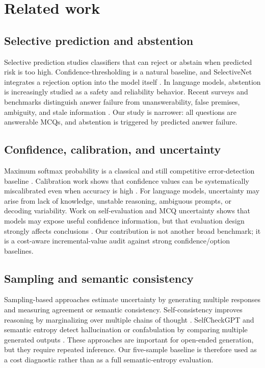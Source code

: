 \documentclass[preprint,12pt,authoryear]{elsarticle}
\begin{document}



\section{Related work}
\subsection{Selective prediction and abstention}
Selective prediction studies classifiers that can reject or abstain when predicted risk is too high. Confidence-thresholding is a natural baseline, and SelectiveNet integrates a rejection option into the model itself \citep{geifman2017selective,geifman2019selectivenet}. In language models, abstention is increasingly studied as a safety and reliability behavior. Recent surveys and benchmarks distinguish answer failure from unanswerability, false premises, ambiguity, and stale information \citep{wen2025limits,kirichenko2025abstentionbench}. Our study is narrower: all questions are answerable MCQs, and abstention is triggered by predicted answer failure.

\subsection{Confidence, calibration, and uncertainty}
Maximum softmax probability is a classical and still competitive error-detection baseline \citep{hendrycks2017baseline}. Calibration work shows that confidence values can be systematically miscalibrated even when accuracy is high \citep{guo2017calibration}. For language models, uncertainty may arise from lack of knowledge, unstable reasoning, ambiguous prompts, or decoding variability. Work on self-evaluation and MCQ uncertainty shows that models may expose useful confidence information, but that evaluation design strongly affects conclusions \citep{kadavath2022lmknow,wang2025ubench}. Our contribution is not another broad benchmark; it is a cost-aware incremental-value audit against strong confidence/option baselines.

\subsection{Sampling and semantic consistency}
Sampling-based approaches estimate uncertainty by generating multiple responses and measuring agreement or semantic consistency. Self-consistency improves reasoning by marginalizing over multiple chains of thought \citep{wang2023selfconsistency}. SelfCheckGPT and semantic entropy detect hallucination or confabulation by comparing multiple generated outputs \citep{manakul2023selfcheckgpt,farquhar2024semanticentropy}. These approaches are important for open-ended generation, but they require repeated inference. Our five-sample baseline is therefore used as a cost diagnostic rather than as a full semantic-entropy evaluation.
\end{document}
